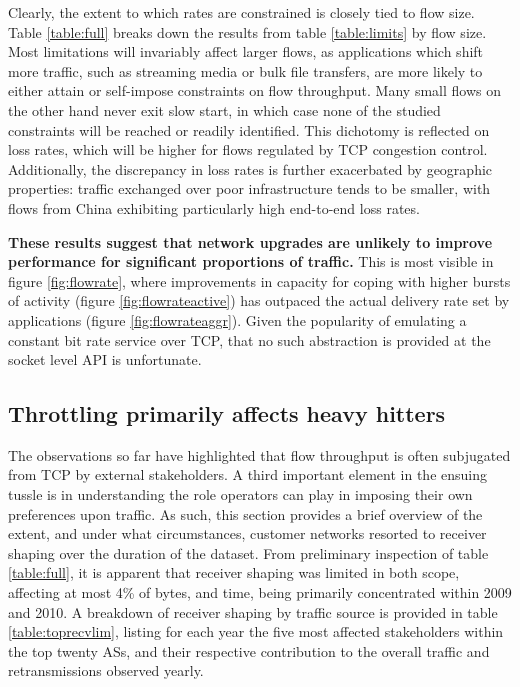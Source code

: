 Clearly, the extent to which rates are constrained is closely tied to flow size. 
Table \ref{table:full} breaks down the results from table \ref{table:limits} by flow size. 
Most limitations will invariably affect larger flows, as applications which shift more traffic, such as streaming media or bulk file transfers, are more likely to either attain or self-impose constraints on flow throughput. 
Many small flows on the other hand never exit slow start, in which case none of the studied constraints will be reached or readily identified. 
This dichotomy is reflected on loss rates, which will be higher for flows regulated by \ac{TCP} congestion control.
Additionally, the discrepancy in loss rates is further exacerbated by geographic properties: traffic exchanged over poor infrastructure tends to be smaller, with flows from China exhibiting particularly high end-to-end loss rates. 

\textbf{These results suggest that network upgrades are unlikely to improve performance for significant proportions of traffic.} 
This is most visible in figure \ref{fig:flowrate}, where improvements in capacity for coping with higher bursts of activity (figure \ref{fig:flowrateactive}) has outpaced the actual delivery rate set by applications (figure \ref{fig:flowrateaggr}).
Given the popularity of emulating a constant bit rate service over \ac{TCP}, that no such abstraction is provided at the socket level \acs{API} is unfortunate.


\subsection{Throttling primarily affects heavy hitters}

The observations so far have highlighted that flow throughput is often subjugated from \ac{TCP} by external stakeholders.
A third important element in the ensuing tussle is in understanding the role operators can play in imposing their own preferences upon traffic.
As such, this section provides a brief overview of the extent, and under what circumstances, customer networks resorted to receiver shaping over the duration of the dataset.
From preliminary inspection of table \ref{table:full}, it is apparent that receiver shaping was limited in both scope, affecting at most 4\% of bytes, and time, being primarily concentrated within 2009 and 2010.
A breakdown of receiver shaping by traffic source is provided in table \ref{table:toprecvlim}, listing for each year the five most affected stakeholders within the top twenty \acp{AS}, and their respective contribution to the overall traffic and retransmissions observed yearly.

